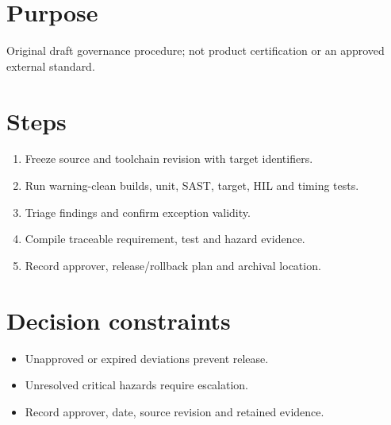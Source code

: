 \documentclass[10pt,letterpaper]{article}
\begin{document}
\makedoctitle
\makedocsummary
\section{Purpose}
Original draft governance procedure; not product certification or an approved external standard.
\section{Steps}
\begin{enumerate}
\item Freeze source and toolchain revision with target identifiers.
\item Run warning-clean builds, unit, SAST, target, HIL and timing tests.
\item Triage findings and confirm exception validity.
\item Compile traceable requirement, test and hazard evidence.
\item Record approver, release/rollback plan and archival location.
\end{enumerate}

\section{Decision constraints}
\begin{itemize}
\item Unapproved or expired deviations prevent release.
\item Unresolved critical hazards require escalation.
\item Record approver, date, source revision and retained evidence.
\end{itemize}
\end{document}
